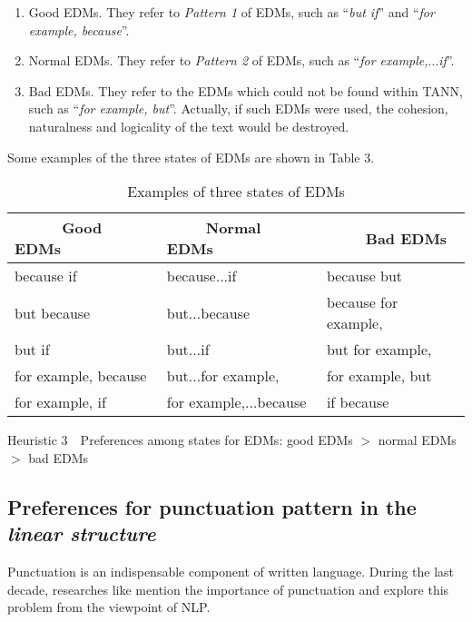 \documentclass[english]{jnlp_1.2.0}
\begin{document}
\begin{enumerate}
   \item Good EDMs. They refer to \textit{Pattern 1} of EDMs, 
   such as ``\textit{but if}'' and ``\textit{for example, because}''.
   \item Normal EDMs. They refer to \textit{Pattern 2} of EDMs, 
   such as ``\textit{for example,}...\textit{if}''.
   \item Bad EDMs. They refer to the EDMs which could not be found within 
   TANN, such as ``\textit{for example, but}''. Actually, if such 
   EDMs were used, the cohesion, naturalness and logicality of the text 
   would be destroyed.
\end{enumerate}

Some examples of the three states of EDMs are shown in Table 3.

\begin{table}[t]
\caption{Examples of three states of EDMs}
\begin{center}
 \begin{tabular}{|l|l|l|}               \hline
 ~~~~~ Good EDMs &~~~~ Normal EDMs  &~~~~ Bad EDMs  \\ \hline \hline
  because if           & because...if            & because but    \\
  but because          & but...because           & because for example,   \\
  but if               & but...if                & but for example,   \\
  for example, because & but...for example,      & for example, but  \\
  for example, if      & for example,...because  & if because  \\ \hline
\end{tabular}
\end{center}
\end{table}

\textsf{Heuristic 3}~~Preferences among states for EDMs: good EDMs $>$ normal EDMs $>$ bad EDMs  


\subsection{Preferences for punctuation pattern in the \textit{linear structure}}

Punctuation is an indispensable component of written language. 
During the last decade, researches like \cite{Hovy91,Dale91,White95,Briscoe96,Jones96} 
mention the importance of punctuation and explore this problem 
from the viewpoint of NLP. 
\end{document}
